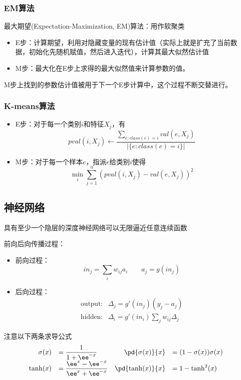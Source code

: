 \subsubsection{EM算法}
最大期望(Expectation-Maximization, EM)算法：用作软聚类
\begin{itemize}
	\item E步：计算期望，利用对隐藏变量的现有估计值（实际上就是扩充了当前数据，初始化先随机赋值，然后进入迭代），计算其最大似然估计值
	\item M步：最大化在E步上求得的最大似然值来计算参数的值。
\end{itemize}
M步上找到的参数估计值被用于下一个E步计算中，这个过程不断交替进行。

\subsubsection{K-means算法}
\begin{itemize}
	\item E步：对于每一个类别$i$和特征$X_j$，有
	\[pval(i,X_j)\gets\frac{\sum_{e:class(e)=i}val(e,X_j)}{|\{e:class(e)=i\}|}\]
	\item M步：对于每一个样本$e$，指派$e$给类别$i$使得
	\[\min_i\sum_{j=1}^n(pval(i,X_j)-val(e,X_j))^2\]
\end{itemize}

\subsection{神经网络}
\begin{theorem}
具有至少一个隐层的深度神经网络可以无限逼近任意连续函数
\end{theorem}

前向后向传播过程：
\begin{itemize}
	\item 前向过程：
	\[in_j=\sum_i w_{ij}a_i\qquad a_j=g(in_j)\]
	\item 后向过程：
	\[\begin{aligned}
	\text{output:} & \Delta_j=g'(in_j)(y_j-a_j)\\
	\text{hidden:} & \Delta_i=g'(in_i)\sum_j w_{ij}\Delta_j
	\end{aligned}\]
\end{itemize}

注意以下两条求导公式
\[\begin{array}{rlrl}
\sigma(x)&=\dfrac{1}{1+\ee^{-x}} & \pd{\sigma(x)}{x}&=(1-\sigma(x))\sigma(x)\\
\tanh(x)&=\dfrac{\ee^x-\ee^{-x}}{\ee^x+\ee^{-x}} & \pd{\tanh(x)}{x}&=1-\tanh^2(x)
\end{array}\]

